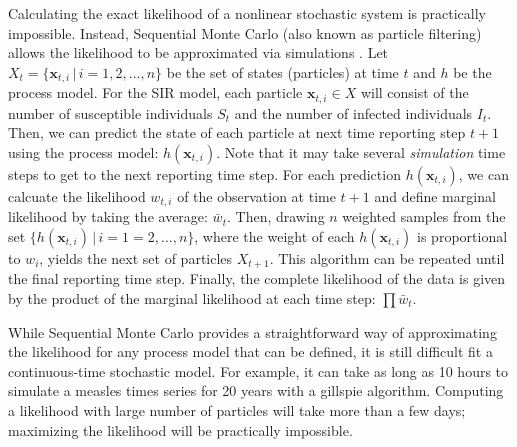 \documentclass{article}
\begin{document}
Calculating the exact likelihood of a nonlinear stochastic system is practically impossible.
Instead, Sequential Monte Carlo (also known as particle filtering) allows the likelihood to be approximated via simulations \citep{doucet2001introduction, arulampalam2002tutorial}.
Let $X_t = \{\mathbf{x}_{t, i} \,|\, i= 1, 2, \dots, n\}$ be the set of states (particles) at time $t$ and $h$ be the process model.
For the SIR model, each particle $\mathbf{x}_{t, i} \in X$ will consist of the number of susceptible individuals $S_t$ and the number of infected individuals $I_t$.
Then, we can predict the state of each particle at next time reporting step $t+1$ using the process model: $h(\mathbf{x}_{t, i})$.
Note that it may take several \emph{simulation} time steps to get to the next reporting time step.
For each prediction $h(\mathbf{x}_{t, i})$, we can calcuate the likelihood $w_{t,i}$ of the observation at time $t+1$ and define marginal likelihood by taking the average: $\bar{w}_t$.
Then, drawing $n$ weighted samples from the set $\{h(\mathbf{x}_{t, i}) \,|\, i = 1=2, \dots, n\}$, where the weight of each $h(\mathbf{x}_{t, i})$ is proportional to $w_i$, yields the next set of particles $X_{t+1}$.
This algorithm can be repeated until the final reporting time step.
Finally, the complete likelihood of the data is given by the product of the marginal likelihood at each time step: $\prod \bar{w}_{t}$.

While Sequential Monte Carlo provides a straightforward way of approximating the likelihood for any process model that can be defined, it is still difficult fit a continuous-time stochastic model. 
For example, it can take as long as 10 hours to simulate a measles times series for 20 years with a gillspie algorithm.
Computing a likelihood with large number of particles will take more than a few days; 
maximizing the likelihood will be practically impossible.
\end{document}
